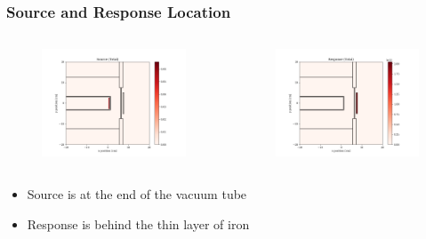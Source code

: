 \documentclass[t]{beamer}
\begin{document}
\begin{frame}
  \frametitle{Source and Response Location}
  \begin{columns}
    \begin{figure}
      \includegraphics[trim={0.7in 0.15in 1.05in 0.4in},clip,scale=0.36]{images/source_total.png}
    \end{figure}
    \begin{figure}
      \includegraphics[trim={0.7in 0.15in 1.05in 0.4in},clip,scale=0.36]{images/response_total.png}
    \end{figure}
  \end{columns}
  \begin{itemize}
    \item Source is at the end of the vacuum tube
    \item Response is behind the thin layer of iron
  \end{itemize}
\end{frame}
\end{document}
